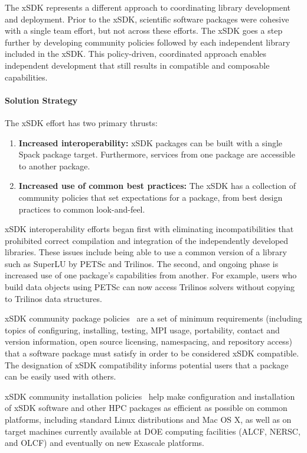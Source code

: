 The xSDK represents a different approach to coordinating library development and deployment.  Prior to the xSDK, scientific software packages were cohesive with a single team effort, but not across these efforts. The xSDK goes a step further by developing community policies followed by each independent library included in the xSDK.  This policy-driven, coordinated approach enables independent development that still results in compatible and composable capabilities.

\paragraph{Solution Strategy}

The xSDK effort has two primary thrusts:
\begin{enumerate}
	\item \textbf{Increased interoperability:} xSDK packages can be built with a single Spack package target.  Furthermore, services from one package are accessible to another package.
	\item \textbf{Increased use of common best practices:}  The xSDK has a collection of community policies that set expectations for a package, from best design practices to common look-and-feel.
\end{enumerate}

xSDK interoperability efforts began first with eliminating incompatibilities that prohibited correct compilation and integration of the independently developed libraries.  These issues include being able to use a common version of a library such as SuperLU by PETSc and Trilinos.  The second, and ongoing phase is increased use of one package's capabilities from another.  For example, users who build data objects using PETSc can now access Trilinos solvers without copying to Trilinos data structures.

xSDK community package policies~\cite{xsdk-policies:homepage,
xSDK-community-package-policies2018} are a set of minimum requirements (including topics of configuring, installing, testing, MPI usage, portability, contact and version information, open source licensing, namespacing, and repository access) that a software package must satisfy in order to be considered xSDK compatible. The designation of xSDK compatibility informs potential users that a package can be easily used with others. 

xSDK community installation policies~\cite{xSDK-community-installation-policies2017} help make configuration and installation of xSDK software and other HPC packages as efficient as possible on common platforms, including standard Linux distributions and Mac OS X, as well as on target machines currently available at DOE computing facilities (ALCF, NERSC, and OLCF) and eventually on new Exascale platforms.

